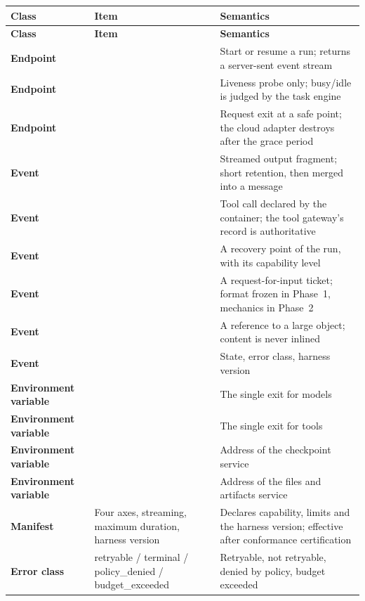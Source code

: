 \begin{longtable}{@{}>{\bfseries}L{2.6cm}L{4.2cm}L{\dimexpr\textwidth-6.8cm-4\tabcolsep\relax}@{}}
  \toprule
  \textbf{Class} & \textbf{Item} & \textbf{Semantics}\\
  \midrule
  \endfirsthead
  \toprule
  \textbf{Class} & \textbf{Item} & \textbf{Semantics}\\
  \midrule
  \endhead
  Endpoint &  & Start or resume a run; returns a server-sent event stream\\
  Endpoint &  & Liveness probe only; busy/idle is judged by the task engine\\
  Endpoint &  & Request exit at a safe point; the cloud adapter destroys after the grace period\\
  Event &  & Streamed output fragment; short retention, then merged into a message\\
  Event &  & Tool call declared by the container; the tool gateway's record is authoritative\\
  Event &  & A recovery point of the run, with its capability level\\
  Event &  & A request-for-input ticket; format frozen in Phase~1, mechanics in Phase~2\\
  Event &  & A reference to a large object; content is never inlined\\
  Event &  & State, error class, harness version\\
  Environment variable &  & The single exit for models\\
  Environment variable &  & The single exit for tools\\
  Environment variable &  & Address of the checkpoint service\\
  Environment variable &  & Address of the files and artifacts service\\
  Manifest & Four axes, streaming, maximum duration, harness version & Declares capability, limits and the harness version; effective after conformance certification\\
  Error class & retryable / terminal / policy\_denied / budget\_exceeded & Retryable, not retryable, denied by policy, budget exceeded\\
  \bottomrule
\end{longtable}

